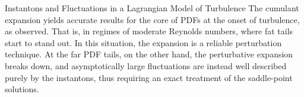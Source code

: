 \begin{chapter}{Instantons and Fluctuations in a Lagrangian Model of Turbulence}
The cumulant expansion yields accurate results for the core of PDFs at the onset of turbulence, as observed. That is, in regimes of moderate Reynolds numbers, where fat tails start to stand out. In this situation, the expansion is a reliable perturbation technique. At the far PDF tails, on the other hand, the perturbative expansion breaks down, and asymptotically large fluctuations are instead well described purely by the instantons, thus requiring an exact treatment of the saddle-point solutions.

\end{chapter}
